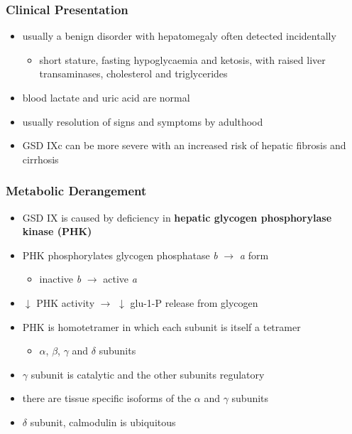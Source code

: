 \documentclass[12pt]{scrartcl}
\begin{document}
\subsubsection{Clinical Presentation}
\label{sec:org2ddb161}
\begin{itemize}
\item usually a benign disorder with hepatomegaly often detected
incidentally
\begin{itemize}
\item short stature, fasting hypoglycaemia and ketosis, with
raised liver transaminases, cholesterol and triglycerides
\end{itemize}
\item blood lactate and uric acid are normal
\item usually resolution of signs and symptoms by adulthood
\item GSD IXc can be more severe with an increased risk of hepatic fibrosis and cirrhosis
\end{itemize}
\subsubsection{Metabolic Derangement}
\label{sec:org67e0f38}
\begin{itemize}
\item GSD IX is caused by deficiency in \textbf{hepatic glycogen phosphorylase kinase (PHK)}
\item PHK phosphorylates glycogen phosphatase \emph{b} \(\to\) \emph{a} form
\begin{itemize}
\item inactive \emph{b} \(\to\)  active \emph{a}
\end{itemize}
\item \(\downarrow\) PHK activity \(\to\) \(\downarrow\) glu-1-P release from glycogen
\item PHK is homotetramer in which each subunit is itself a tetramer
\begin{itemize}
\item \(\alpha\), \(\beta\), \(\gamma\) and \(\delta\) subunits
\end{itemize}
\item \(\gamma\) subunit is catalytic and the other subunits regulatory
\item there are tissue specific isoforms of the \(\alpha\) and \(\gamma\) subunits
\item \(\delta\) subunit, calmodulin is ubiquitous
\end{itemize}
\end{document}
